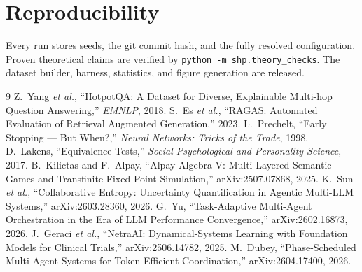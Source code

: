 \documentclass[conference]{IEEEtran}
\begin{document}
\section{Reproducibility}\label{app:repro}
Every run stores seeds, the git commit hash, and the fully resolved configuration.
Proven theoretical claims are verified by \texttt{python -m shp.theory\_checks}.
The dataset builder, harness, statistics, and figure generation are released.

\begin{thebibliography}{9}\small
{} Z.~Yang \emph{et al.}, ``HotpotQA: A Dataset for Diverse,
Explainable Multi-hop Question Answering,'' \emph{EMNLP}, 2018.
 S.~Es \emph{et al.}, ``RAGAS: Automated Evaluation of Retrieval
Augmented Generation,'' 2023.
 L.~Prechelt, ``Early Stopping --- But When?,'' \emph{Neural
Networks: Tricks of the Trade}, 1998.
 D.~Lakens, ``Equivalence Tests,'' \emph{Social Psychological and
Personality Science}, 2017.
 B.~Kilictas and F.~Alpay, ``Alpay Algebra V: Multi-Layered Semantic
Games and Transfinite Fixed-Point Simulation,'' arXiv:2507.07868, 2025.
 K.~Sun \emph{et al.}, ``Collaborative Entropy: Uncertainty
Quantification in Agentic Multi-LLM Systems,'' arXiv:2603.28360, 2026.
 G.~Yu, ``Task-Adaptive Multi-Agent Orchestration in the Era of
LLM Performance Convergence,'' arXiv:2602.16873, 2026.
 J.~Geraci \emph{et al.}, ``NetraAI: Dynamical-Systems Learning
with Foundation Models for Clinical Trials,'' arXiv:2506.14782, 2025.
 M.~Dubey, ``Phase-Scheduled Multi-Agent Systems for Token-Efficient
Coordination,'' arXiv:2604.17400, 2026.
\end{thebibliography}
\end{document}

